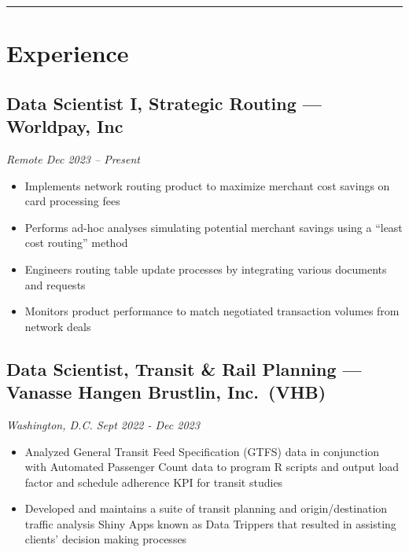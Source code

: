 \documentclass[
  11pt,
]{article}
\providecommand{\tightlist}{%
  \setlength{\itemsep}{0pt}\setlength{\parskip}{0pt}}\usepackage{longtable,booktabs,array}
\begin{document}
\begin{center}\rule{0.5\linewidth}{0.5pt}\end{center}

\hypertarget{experience}{%
\section{Experience}\label{experience}}

\hypertarget{data-scientist-i-strategic-routing-worldpay-inc}{%
\subsection{Data Scientist I, Strategic Routing --- Worldpay,
Inc}\label{data-scientist-i-strategic-routing-worldpay-inc}}

\emph{Remote \textbar{} Dec 2023 -- Present}

\begin{itemize}
\tightlist
\item
  Implements network routing product to maximize merchant cost savings
  on card processing fees
\item
  Performs ad-hoc analyses simulating potential merchant savings using a
  ``least cost routing'' method
\item
  Engineers routing table update processes by integrating various
  documents and requests
\item
  Monitors product performance to match negotiated transaction volumes
  from network deals
\end{itemize}

\hypertarget{data-scientist-transit-rail-planning-vanasse-hangen-brustlin-inc.-vhb}{%
\subsection{Data Scientist, Transit \& Rail Planning --- Vanasse Hangen
Brustlin,
Inc.~(VHB)}\label{data-scientist-transit-rail-planning-vanasse-hangen-brustlin-inc.-vhb}}

\emph{Washington, D.C. \textbar{} Sept 2022 - Dec 2023}

\begin{itemize}
\tightlist
\item
  Analyzed General Transit Feed Specification (GTFS) data in conjunction
  with Automated Passenger Count data to program R scripts and output
  load factor and schedule adherence KPI for transit studies
\item
  Developed and maintains a suite of transit planning and
  origin/destination traffic analysis Shiny Apps known as Data Trippers
  that resulted in assisting clients' decision making processes
\end{itemize}
\end{document}
